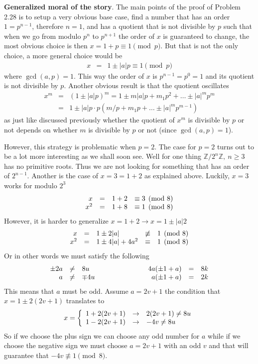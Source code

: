 \documentclass[aps,preprint,preprintnumbers,nofootinbib,showpacs,prd]{revtex4-1}
\newcommand{\ba}{\begin{array}}
\newcommand{\ea}{\end{array}}
\newcommand{\nbea}{\begin{eqnarray*}}
\newcommand{\neea}{\end{eqnarray*}}
\begin{document}
{\bf Generalized moral of the story}. The main points of the proof of Problem 2.28 is to setup a very obvious base case, find a number that has an order $1 = p^{n-1}$, therefore $n=1$, and has a quotient that is not divisible by $p$ such that when we go from modulo $p^n$ to $p^{n+1}$ the order of $x$ is guaranteed to change, the most obvious choice is then $x = 1 + p \equiv 1 \pmod{p}$. But that is not the only choice, a more general choice would be
%
\nbea
x & = & 1 \pm |a| p \equiv 1 \pmod{p}
\neea
%
where $\gcd(a,p) = 1$. This way the order of $x$ is $p^{n-1} = p^0 = 1$ and its quotient is not divisible by $p$. Another obvious result is that the quotient oscillates
%
\nbea
x^m & = & (1 \pm |a|p)^m = 1 \pm m|a|p + m_1 p^2 + \dots \pm |a|^m p^m \\
& = & 1 \pm |a|p \cdot p(m/p + m_1 p + \dots \pm |a|^mp^{m-1})
\neea
%
as just like discussed previously whether the quotient of $x^m$ is divisible by $p$ or not depends on whether $m$ is divisible by $p$ or not (since $\gcd(a,p) = 1$).

However, this strategy is problematic when $p=2$. The case for $p=2$  turns out to be a lot more interesting as we shall soon see. Well for one thing $\mathbb{Z}/2^n\mathbb{Z},~n \ge 3$ has no primitive roots. Thus we are not looking for something that has an order of $2^{n-1}$. Another is the case of $x = 3 = 1 + 2$ as explained above. Luckily, $x=3$ works for modulo $2^3$
%
\nbea
\ba{r c l c l}
x & = & 1 + 2 & \equiv 3 \pmod{8} \\
x^2 & = & 1 + 8 & \equiv 1 \pmod{8}
\ea
\neea
%
However, it is harder to generalize $x = 1 + 2 \to x = 1 \pm |a|2$
%
\nbea
\ba{r c l c r}
x & = & 1 \pm 2|a| & \not\equiv & 1 \pmod{8} \\
x^2 & = & 1 \pm 4|a| + 4a^2 & \equiv & 1 \pmod{8}
\ea
\neea
%
Or in other words we must satisfy the following
%
\nbea
\ba{r c l c r c l}
\pm 2a & \neq & 8u & ~~~~~~~~~~~~~~~~~ & 4a(\pm1 + a) & = & 8 k \\
a & \neq & \mp 4u & & a(\pm1 + a) & = & 2 k
\ea
\neea
%
This means that $a$ must be odd. Assume $a = 2v + 1$ the condition that $x = 1 \pm 2(2v+1)$ translates to
%
\nbea
x =  \left \{ \ba{l c l}
1 + 2(2v+1) & \to & 2(2v+1) \neq 8u \\
1 - 2(2v+1) & \to & -4v \neq 8u
\ea
\right.
\neea
%
So if we choose the plus sign we can choose any odd number for $a$ while if we choose the negative sign we must choose $a = 2v+1$ with an odd $v$ and that will guarantee that $-4v \not\equiv 1 \pmod{8}$.
\end{document}
